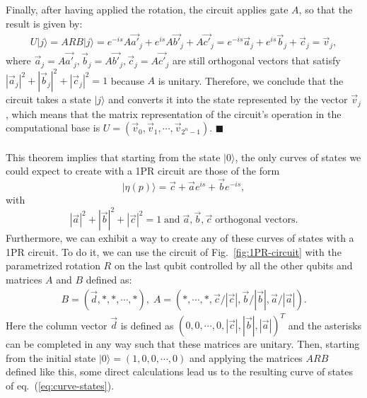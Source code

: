 \documentclass[10pt,letterpaper]{article} %
\newcommand{\fref}[1]{Fig.~\ref{#1}}
\newcommand{\eref}[1]{eq.~(\ref{#1})}
\begin{document}
Finally, after having applied the rotation, the circuit applies gate $A$, 
so that the result is given by:
\begin{eqnarray}
U|j\rangle = ARB|j\rangle = e^{-is} A \vec{a'}_j + e^{is} A \vec{b'}_j + A \vec{c'}_j = e^{-is} \vec{a}_j + e^{is} \vec{b}_j + \vec{c}_j = \vec{v}_j,
\end{eqnarray}
where $\vec{a}_j = A \vec{a'}_j , \vec{b}_j = A \vec{b'}_j , \vec{c}_j = A \vec{c'}_j$ are still orthogonal
vectors that satisfy $|\vec{a}_j|^2 + |\vec{b}_j|^2 + |\vec{c}_j|^2 = 1$ because $A$ is unitary. 
Therefore, we conclude that the circuit takes a state $|j\rangle$ and converts it
 into the state represented by the vector $\vec{v}_j$, which means that the matrix representation of the circuit's operation in the 
computational base is
 $U = (\vec{v}_0, \vec{v}_1, \cdots, \vec{v}_{2^n-1})$. $\blacksquare$  \\
 $\;$ \\
 
This theorem implies that starting from the state $|0\rangle$,
the only curves of states we could expect to create
with a 1PR circuit are those of the form
\begin{equation}
|\eta(p)\rangle = \vec{c} + \vec{a} e^{is} + \vec{b} e^{-is},
\label{eq:curve-states}
\end{equation}
with 
\begin{equation}
|\vec{a}|^2 + |\vec{b}|^2 + |\vec{c}|^2 = 1  \; \text{and} \; \vec{a}, \vec{b}, \vec{c} \; \text{orthogonal vectors}.
\label{eq:conditions-vecs}
\end{equation}
Furthermore, we can exhibit a way to create any of these curves of states
with a 1PR circuit.
To do it, we can use the circuit of \fref{fig:1PR-circuit} with the parametrized
rotation $R$ on the last qubit controlled by all the other qubits
and matrices $A$ and $B$ defined as:
\begin{align*}
B = (\vec{d}, *,*, \cdots,*), \; 
A = (* , \cdots, *, \vec{c}/|\vec{c}|, \vec{b}/|\vec{b}|, \vec{a}/|\vec{a}|).
\end{align*}
Here the column vector $\vec{d}$ is defined as 
$(0,0, \cdots,0 ,|\vec{c}|, |\vec{b}|, |\vec{a}|)^T$
and the asterisks can be completed in any
way such that these matrices are unitary.
Then, starting from the initial state $|0\rangle = (1,0,0,\cdots,0)$
and applying the matrices $ARB$ defined
like this, some direct calculations lead us  to 
the resulting curve of states
of \eref{eq:curve-states}.
\end{document}
